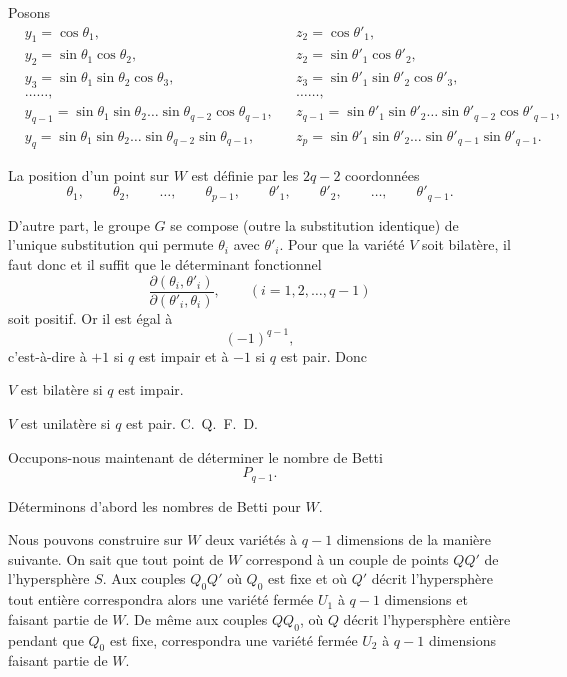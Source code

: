 \documentclass{article}
\begin{document}
Posons
\[ \begin{aligned} &y_{1} = \cos \theta_{1}, &&z_{2} = \cos \theta'_{1},\\ &y_{2} = \sin \theta_{1} \cos \theta_{2}, &&z_{2} = \sin \theta'_{1} \cos \theta'_{2},\\ &y_{3} = \sin \theta_{1} \sin \theta_{2} \cos \theta_{3}, &&z_{3} = \sin \theta'_{1} \sin \theta'_{2} \cos \theta'_{3},\\ &\ldots\ldots, &&\ldots\ldots,\\ &y_{q-1} = \sin \theta_{1} \sin \theta_{2} \ldots \sin \theta_{q-2} \cos \theta_{q-1}, &&z_{q-1} = \sin \theta'_{1} \sin \theta'_{2} \ldots \sin \theta'_{q-2} \cos \theta'_{q-1},\\ &y_{q} = \sin \theta_{1} \sin \theta_{2} \ldots \sin \theta_{q-2} \sin \theta_{q-1}, &&z_{p} = \sin \theta'_{1} \sin \theta'_{2} \ldots \sin \theta'_{q-1} \sin \theta'_{q-1}. \end{aligned} \]

La position d'un point sur $W$ est définie par les $2q - 2$ coordonnées
\[ \theta_{1}, \qquad \theta_{2}, \qquad \ldots, \qquad \theta_{p-1}, \qquad \theta'_{1}, \qquad \theta'_{2}, \qquad \ldots, \qquad \theta'_{q-1}. \]

D'autre part, le groupe $G$ se compose (outre la substitution identique) de l'unique substitution qui permute $\theta_{i}$ avec $\theta'_{i}$. Pour que la variété $V$ soit bilatère, il faut donc et il suffit que le déterminant fonctionnel
\[ \frac{\partial(\theta_{i}, \theta'_{i})}{\partial(\theta'_{i}, \theta_{i})}, \qquad (i = 1, 2, \ldots, q - 1) \]
soit positif. Or il est égal à
\[ (-1)^{q-1}, \]
c'est-à-dire à $+1$ si $q$ est impair et à $-1$ si $q$ est pair. Donc

$V$ est bilatère si $q$ est impair.

$V$ est unilatère si $q$ est pair. C.~Q.~F.~D.

Occupons-nous maintenant de déterminer le nombre de Betti
\[ P_{q-1}. \]

Déterminons d'abord les nombres de Betti pour $W$.

Nous pouvons construire sur $W$ deux variétés à $q - 1$ dimensions de la manière suivante. On sait que tout point de $W$ correspond à un couple de points $QQ'$ de l'hypersphère $S$. Aux couples $Q_{0}Q'$ où $Q_{0}$ est fixe et où $Q'$ décrit l'hypersphère tout entière correspondra alors une variété fermée $U_{1}$ à $q - 1$ dimensions et faisant partie de $W$. De même aux couples $QQ_{0}$, où $Q$ décrit l'hypersphère entière pendant que $Q_{0}$ est fixe, correspondra une variété fermée $U_{2}$ à $q - 1$ dimensions faisant partie de $W$.
\end{document}

